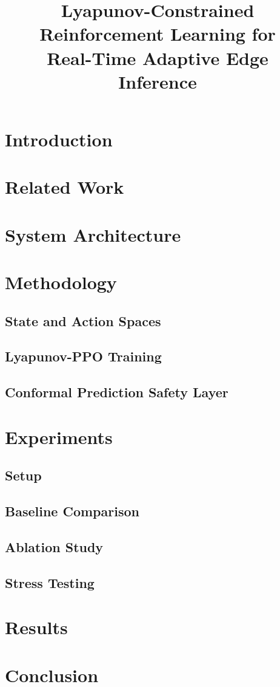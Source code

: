 \documentclass[conference]{IEEEtran}
\title{Lyapunov-Constrained Reinforcement Learning for\\Real-Time Adaptive Edge Inference}
\author{
}
\begin{document}
\maketitle

\begin{abstract}
\end{abstract}

\section{Introduction}

\section{Related Work}

\section{System Architecture}

\section{Methodology}

\subsection{State and Action Spaces}

\subsection{Lyapunov-PPO Training}

\subsection{Conformal Prediction Safety Layer}

\section{Experiments}

\subsection{Setup}

\subsection{Baseline Comparison}

\subsection{Ablation Study}

\subsection{Stress Testing}

\section{Results}

\section{Conclusion}



\end{document}
